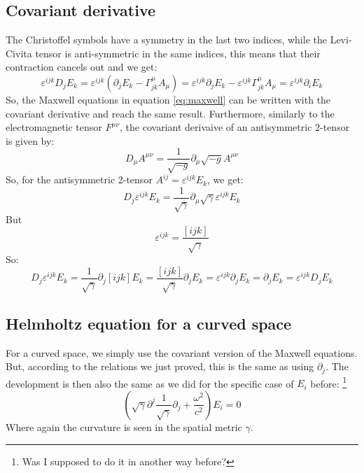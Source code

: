 \documentclass{article}
\begin{document}
\subsection{Covariant derivative}
The Christoffel symbols have a symmetry in the last two indices, while the Levi-Civita tensor is anti-symmetric in the same indices, this means that their contraction cancels out and we get:
\begin{equation}
    \varepsilon^{ijk} D_j E_k = \varepsilon^{ijk} (\partial_j E_k - \Gamma^\mu_{jk} A_\mu) = \varepsilon^{ijk} \partial_j E_k - \varepsilon^{ijk} \Gamma^\mu_{jk} A_\mu = \varepsilon^{ijk} \partial_i E_k
\end{equation}
So, the Maxwell equations in equation \ref{eq:maxwell} can be written with the covariant derivative and reach the same result. Furthermore, similarly to the electromagnetic tensor $F^{\mu\nu}$, the covariant derivaive of an antisymmetric 2-tensor is given by:
\begin{equation}
    D_\mu A^{\mu\nu} = \frac{1}{\sqrt{-g}}\partial_\mu \sqrt{-g}A^{\mu\nu}
\end{equation}
So, for the antisymmetric 2-tensor $A^{ij} = \varepsilon^{ijk}E_k$, we get:
\begin{equation}
    D_j \varepsilon^{ijk}E_k = \frac{1}{\sqrt{\gamma}}\partial_\mu \sqrt{\gamma} \varepsilon^{ijk}E_k
\end{equation}
But
\begin{equation}
    \varepsilon^{ijk} = \frac{[ijk]}{\sqrt{\gamma}}
\end{equation}
So:
\begin{equation}
    D_j \varepsilon^{ijk}E_k = \frac{1}{\sqrt{\gamma}}\partial_j [ijk] E_k = \frac{[ijk]}{\sqrt{\gamma}}\partial_j E_k = \varepsilon^{ijk} \partial_j E_k = \partial_j E_k = \varepsilon^{ijk} D_j E_k
\end{equation}

\subsection{Helmholtz equation for a curved space}
For a curved space, we simply use the covariant version of the Maxwell equations. But, according to the relations we just proved, this is the same as using $\partial_j$. The development is then also the same as we did for the specific case of $E_i$ before:
\footnote{Was I supposed to do it in another way before?}
\begin{equation}
    \left(\sqrt{\gamma}\partial^j \frac{1}{\sqrt{\gamma}}\partial_j + \frac{\omega^2}{c^2}\right) E_i = 0
\end{equation}
Where again the curvature is seen in the spatial metric $\gamma$.
\end{document}
